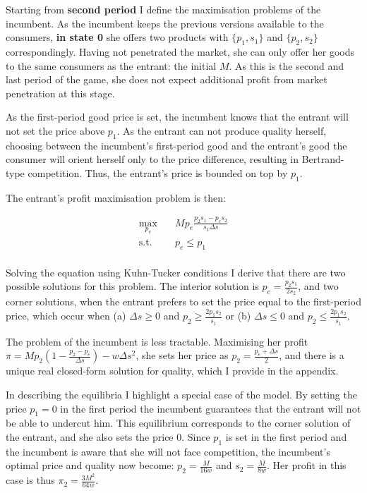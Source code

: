 \documentclass{article}
\numberwithin{figure}{section}
\numberwithin{table}{section}
\theoremstyle{indented}
\numberwithin{equation}{section} %
\begin{document}
Starting from \textbf{second period} I define the maximisation problems of the incumbent. 
As the incumbent keeps the previous versions available to the consumers, \textbf{in state 0} she offers two products with $\{p_1, s_1\}$ and $\{p_2, s_2\}$ correspondingly. Having not penetrated the market, she can only offer her goods to the same consumers as the entrant: the initial $M$. As this is the second and last period of the game, she does not expect additional profit from market penetration at this stage.

As the first-period good price is set, the incumbent knows that the entrant will not set the price above $p_1$. As the entrant can not produce quality herself, choosing between the incumbent's first-period good and the entrant's good the consumer will orient herself only to the price difference, resulting in Bertrand-type competition. Thus, the entrant's price is bounded on top by $p_1$.

The entrant's profit maximisation problem is then:


$$
\begin{aligned}
\max_{p_e} \quad &  Mp_e\tfrac{p_2s_1-p_es_2}{s_1\Delta s}\\
\text{s.t.} \quad & p_e\leq p_1   \\
\end{aligned}
$$

Solving the equation using Kuhn-Tucker conditions I derive that there are two possible solutions for this problem. The interior solution is $p_e = \tfrac{p_2s_1}{2s_2}$, and two corner solutions, when the entrant prefers to set the price equal to the first-period price, which occur when (a) $\Delta s \geq 0$ and $p_2 \geq \tfrac{2p_1s_2}{s_1}$ or (b) $\Delta s \leq 0$ and $p_2 \leq \tfrac{2p_1s_2}{s_1}$. 

The problem of the incumbent is less tractable. Maximising her profit $\pi = Mp_2(1-\tfrac{p_2 - p_e}{\Delta s}) - w\Delta s^2$, she sets her price as $p_2 = \tfrac{p_e+\Delta s}{2}$, and there is a unique real closed-form solution for quality, which I provide in the appendix. 

In describing the equilibria I highlight a special case of the model. By setting the price $p_1 =0$ in the first period the incumbent guarantees that the entrant will not be able to undercut him. This equilibrium corresponds to the corner solution of the entrant, and she also sets the price 0. Since $p_1$ is set in the first period and the incumbent is aware that she will not face competition, the incumbent's optimal price and quality now become: $p_2 = \tfrac{M}{16w}$ and $s_2 = \tfrac{M}{8w}$. Her profit in this case is thus $\pi_2 = \tfrac{3M^2}{64w}$.
\end{document}
